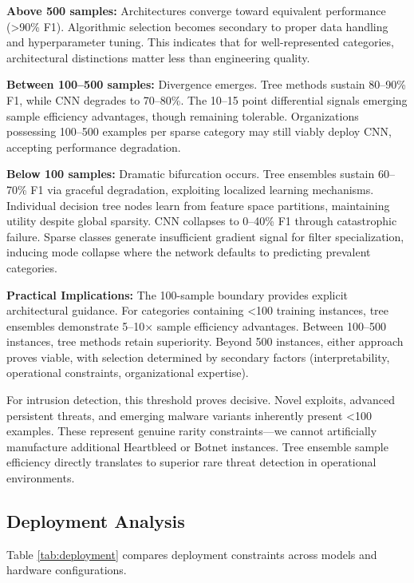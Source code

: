 \documentclass[10pt,twocolumn]{article}
\begin{document}
\textbf{Above 500 samples:} Architectures converge toward equivalent performance (>90\% F1). Algorithmic selection becomes secondary to proper data handling and hyperparameter tuning. This indicates that for well-represented categories, architectural distinctions matter less than engineering quality.

\textbf{Between 100--500 samples:} Divergence emerges. Tree methods sustain 80--90\% F1, while CNN degrades to 70--80\%. The 10--15 point differential signals emerging sample efficiency advantages, though remaining tolerable. Organizations possessing 100--500 examples per sparse category may still viably deploy CNN, accepting performance degradation.

\textbf{Below 100 samples:} Dramatic bifurcation occurs. Tree ensembles sustain 60--70\% F1 via graceful degradation, exploiting localized learning mechanisms. Individual decision tree nodes learn from feature space partitions, maintaining utility despite global sparsity. CNN collapses to 0--40\% F1 through catastrophic failure. Sparse classes generate insufficient gradient signal for filter specialization, inducing mode collapse where the network defaults to predicting prevalent categories.

\textbf{Practical Implications:} The 100-sample boundary provides explicit architectural guidance. For categories containing <100 training instances, tree ensembles demonstrate 5--10× sample efficiency advantages. Between 100--500 instances, tree methods retain superiority. Beyond 500 instances, either approach proves viable, with selection determined by secondary factors (interpretability, operational constraints, organizational expertise).

For intrusion detection, this threshold proves decisive. Novel exploits, advanced persistent threats, and emerging malware variants inherently present <100 examples. These represent genuine rarity constraints—we cannot artificially manufacture additional Heartbleed or Botnet instances. Tree ensemble sample efficiency directly translates to superior rare threat detection in operational environments.

\subsection{Deployment Analysis}

Table \ref{tab:deployment} compares deployment constraints across models and hardware configurations.
\end{document}
